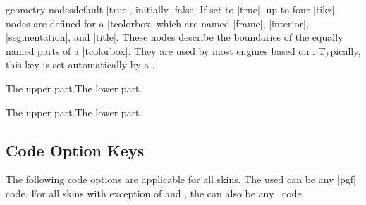 \clearpage
\begin{docTcbKey}{geometry nodes}{}{default |true|, initially |false|}
  If set to |true|, up to four |tikz| nodes are defined for a |tcolorbox|
  which are named |frame|, |interior|, |segmentation|, and |title|. These nodes
  describe the boundaries of the equally named parts of a |tcolorbox|.
  They are used by most engines based on \tikzname.
  Typically, this key is set automatically by a .
\begin{dispExample}

\begin{tcolorbox}[adjusted title=The title]
  The upper part.\tcblower The lower part.
\end{tcolorbox}
\begin{tcolorbox}[enhanced,adjusted title=The title,
  frame code={\path[draw=red,fill=red!25]
      (frame.south west) rectangle (frame.north east);},
  interior titled code={\path[draw=blue,fill=blue!25]
      (interior.south west) rectangle (interior.north east);},
  segmentation code={\path[draw=green,fill=green!25]
      (segmentation.south west) rectangle (segmentation.north east);},
  title code={\path[draw=black,fill=brown!75!black]
      (title.south west) rectangle (title.north east);}]
  The upper part.\tcblower The lower part.
\end{tcolorbox}
\end{dispExample}
\end{docTcbKey}






\clearpage
\subsection{Code Option Keys}\label{subsec:addcodeoptions}
The following code options are applicable for all skins.
The used  can be any |pgf| code. For all skins
with exception of 
and , the  can also
be any \tikzname\ code.


